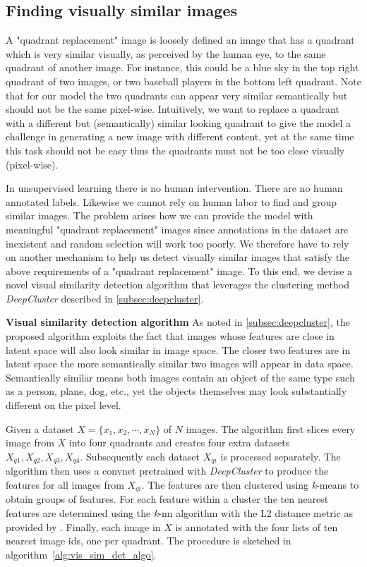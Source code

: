 \documentclass[12pt,a4paper]{article}
\begin{document}
\subsection{Finding visually similar images} \label{subsec_img_clustering}
A "quadrant replacement" image is loosely defined an image that has a quadrant which is very similar visually, as perceived by the human eye, to the same quadrant of another image. For instance, this could be a blue sky in the top right quadrant of two images, or two baseball players in the bottom left quadrant. Note that for our model the two quadrants can appear very similar semantically but should not be the same pixel-wise. Intuitively, we want to replace a quadrant with a different but (semantically) similar looking quadrant to give the model a challenge in generating a new image with different content, yet at the same time this task should not be easy thus the quadrants must not be too close visually (pixel-wise).

In unsupervised learning there is no human intervention. There are no human annotated labels. Likewise we cannot rely on human labor to find and group similar images. The problem arises how we can provide the model with meaningful "quadrant replacement" images since annotations in the dataset are inexistent and random selection will work too poorly. We therefore have to rely on another mechanism to help us detect visually similar images that satisfy the above requirements of a "quadrant replacement" image. To this end, we devise a novel visual similarity detection algorithm that leverages the clustering method \textit{DeepCluster} described in \ref{subsec:deepcluster}.

\textbf{Visual similarity detection algorithm} As noted in \ref{subsec:deepcluster}, the proposed algorithm exploits the fact that images whose features are close in latent space will also look similar in image space. The closer two features are in latent space the more semantically similar two images will appear in data space. Semantically similar means both images contain an object of the same type such as a person, plane, dog, etc., yet the objects themselves may look substantially different on the pixel level.

Given a dataset $X = \{x_1,x_2,\cdots,x_N\}$ of $N$ images. The algorithm first slices every image from $X$ into four quadrants and creates four extra datasets $X_{q1}, X_{q2}, X_{q3}, X_{q4}$. Subsequently each dataset $X_{qi}$ is processed separately. The algorithm then uses a convnet pretrained with \textit{DeepCluster} to produce the features for all images from $X_{qi}$. The features are then clustered using \textit{k}-means to obtain groups of features. For each feature within a cluster the ten nearest features are determined using the \textit{k}-nn algorithm with the L2 distance metric as provided by \cite{FaissKnn}. Finally, each image in $X$ is annotated with the four lists of ten nearest image ids, one per quadrant. The procedure is sketched in algorithm~\ref{alg:vis_sim_det_algo}.
\end{document}
